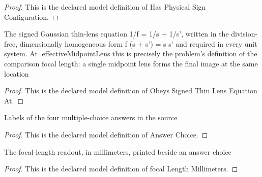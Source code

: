 \begin{proof}
  This is the declared model definition of Has Physical Sign Configuration.
\end{proof}
\begin{definition}
  \label{def:physics:phyx-mini-0165:phyxminiproblems-problemphyxmini0165-obeyssignedthinlensequationat}
  The signed Gaussian thin-lens equation 1/f = 1/s + 1/s', written in the division-free, dimensionally homogeneous form f (s + s') = s s' and required in every unit system. At .effectiveMidpointLens this is precisely the problem's definition of the comparison focal length: a single midpoint lens forms the final image at the same location
\end{definition}
\begin{proof}
  This is the declared model definition of Obeys Signed Thin Lens Equation At.
\end{proof}
\begin{definition}
  \label{def:physics:phyx-mini-0165:phyxminiproblems-problemphyxmini0165-answerchoice}
  Labels of the four multiple-choice answers in the source
\end{definition}
\begin{proof}
  This is the declared model definition of Answer Choice.
\end{proof}
\begin{definition}
  \label{def:physics:phyx-mini-0165:phyxminiproblems-problemphyxmini0165-answerchoice-focallengthmillimeters}
  The focal-length readout, in millimeters, printed beside an answer choice
\end{definition}
\begin{proof}
  This is the declared model definition of focal Length Millimeters.
\end{proof}
